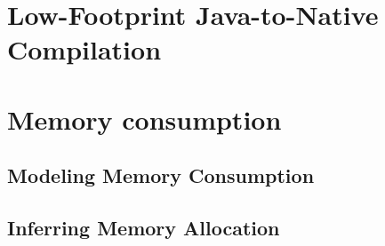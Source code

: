 
\section{Low-Footprint Java-to-Native Compilation}

\section{Memory consumption}

\subsection{Modeling Memory Consumption}\label{sec:verif}

\subsection{Inferring Memory Allocation}\label{sec:infer}


